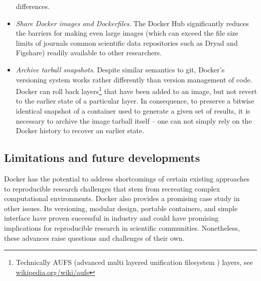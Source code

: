 \documentclass[9pt]{components/acm_proc_article-sp}
\begin{document}
\begin{itemize}
  differences.
\item
  \emph{Share Docker images and Dockerfiles}. The Docker Hub
  significantly reduces the barriers for making even large images (which
  can exceed the file size limits of journals common scientific data
  repositories such as Dryad and Figshare) readily available to other
  researchers.
\item
  \emph{Archive tarball snapshots}. Despite similar semantics to git,
  Docker's versioning system works rather differently than version
  management of code. Docker can roll back layers\footnote{Technically
    AUFS (advanced multi layered unification filesystem ) layers, see
    \href{http://en.wikipedia.org/wiki/aufs}{wikipedia.org/wiki/aufs}}
  that have been added to an image, but not revert to the earlier state
  of a particular layer. In consequence, to preserve a bitwise identical
  snapshot of a container used to generate a given set of results, it is
  necessary to archive the image tarball itself -- one can not simply
  rely on the Docker history to recover an earlier state.
\end{itemize}

\subsection{Limitations and future
developments}\label{limitations-and-future-developments}

Docker has the potential to address shortcomings of certain existing
approaches to reproducible research challenges that stem from recreating
complex computational environments. Docker also provides a promising
case study in other issues. Its versioning, modular design, portable
containers, and simple interface have proven successful in industry and
could have promising implications for reproducible research in
scientific communities. Nonetheless, these advances raise questions and
challenges of their own.
\end{document}
